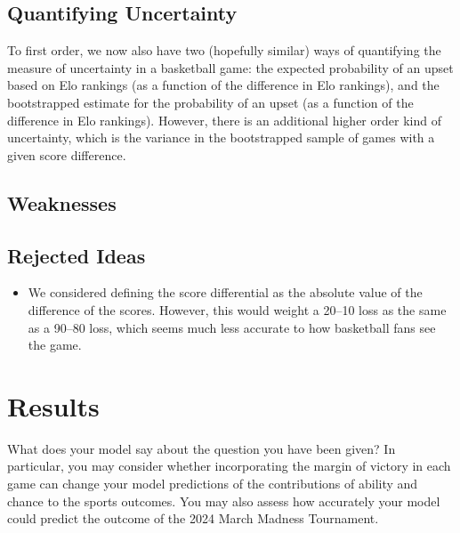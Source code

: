 \documentclass{article}
\begin{document}
\subsection{Quantifying Uncertainty}
To first order, we now also have two (hopefully similar) ways of quantifying the measure of uncertainty in a basketball game: the expected probability of an upset based on Elo rankings (as a function of the difference in Elo rankings), and the bootstrapped estimate for the probability of an upset (as a function of the difference in Elo rankings). However, there is an additional higher order kind of uncertainty, which is the variance in the bootstrapped sample of games with a given score difference. 


\subsection{Weaknesses}

\subsection{Rejected Ideas}
\begin{itemize}
    \item We considered defining the score differential as the absolute value of the difference of the scores. However, this would weight a 20--10 loss as the same as a 90--80 loss, which seems much less accurate to how basketball fans see the game.
\end{itemize}

\section{Results}
What does your model say about the question you have been given?
In particular, you may consider whether
incorporating the margin of victory in each game can change your model predictions of the contributions of
ability and chance to the sports outcomes. You may also assess how accurately your model could predict the
outcome of the 2024 March Madness Tournament.
\end{document}
